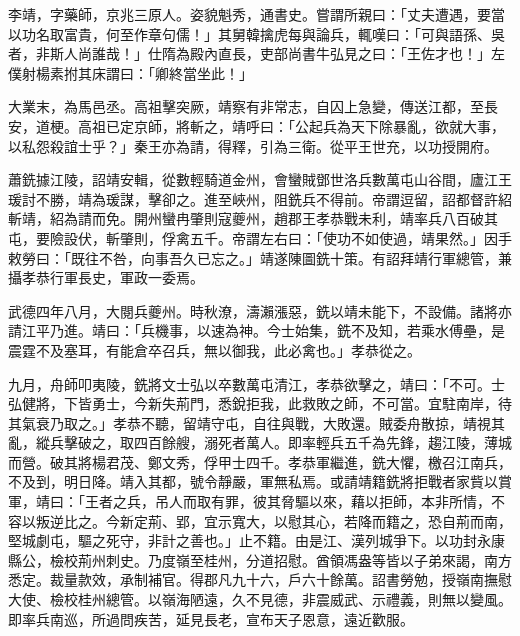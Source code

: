 
\begin{pinyinscope}

 李靖，字藥師，京兆三原人。姿貌魁秀，通書史。嘗謂所親曰：「丈夫遭遇，要當以功名取富貴，何至作章句儒！」其舅韓擒虎每與論兵，輒嘆曰：「可與語孫、吳者，非斯人尚誰哉！」仕隋為殿內直長，吏部尚書牛弘見之曰：「王佐才也！」左僕射楊素拊其床謂曰：「卿終當坐此！」



 大業末，為馬邑丞。高祖擊突厥，靖察有非常志，自囚上急變，傳送江都，至長安，道梗。高祖已定京師，將斬之，靖呼曰：「公起兵為天下除暴亂，欲就大事，以私怨殺誼士乎？」秦王亦為請，得釋，引為三衛。從平王世充，以功授開府。



 蕭銑據江陵，詔靖安輯，從數輕騎道金州，會蠻賊鄧世洛兵數萬屯山谷間，廬江王瑗討不勝，靖為瑗謀，擊卻之。進至峽州，阻銑兵不得前。帝謂逗留，詔都督許紹斬靖，紹為請而免。開州蠻冉肇則寇夔州，趙郡王孝恭戰未利，靖率兵八百破其屯，要險設伏，斬肇則，俘禽五千。帝謂左右曰：「使功不如使過，靖果然。」因手敕勞曰：「既往不咎，向事吾久已忘之。」靖遂陳圖銑十策。有詔拜靖行軍總管，兼攝孝恭行軍長史，軍政一委焉。



 武德四年八月，大閱兵夔州。時秋潦，濤瀨漲惡，銑以靖未能下，不設備。諸將亦請江平乃進。靖曰：「兵機事，以速為神。今士始集，銑不及知，若乘水傅壘，是震霆不及塞耳，有能倉卒召兵，無以御我，此必禽也。」孝恭從之。



 九月，舟師叩夷陵，銑將文士弘以卒數萬屯清江，孝恭欲擊之，靖曰：「不可。士弘健將，下皆勇士，今新失荊門，悉銳拒我，此救敗之師，不可當。宜駐南岸，待其氣衰乃取之。」孝恭不聽，留靖守屯，自往與戰，大敗還。賊委舟散掠，靖視其亂，縱兵擊破之，取四百餘艘，溺死者萬人。即率輕兵五千為先鋒，趨江陵，薄城而營。破其將楊君茂、鄭文秀，俘甲士四千。孝恭軍繼進，銑大懼，檄召江南兵，不及到，明日降。靖入其都，號令靜嚴，軍無私焉。或請靖籍銑將拒戰者家貲以賞軍，靖曰：「王者之兵，吊人而取有罪，彼其脅驅以來，藉以拒師，本非所情，不容以叛逆比之。今新定荊、郢，宜示寬大，以慰其心，若降而籍之，恐自荊而南，堅城劇屯，驅之死守，非計之善也。」止不籍。由是江、漢列城爭下。以功封永康縣公，檢校荊州刺史。乃度嶺至桂州，分道招慰。酋領馮盎等皆以子弟來謁，南方悉定。裁量款效，承制補官。得郡凡九十六，戶六十餘萬。詔書勞勉，授嶺南撫慰大使、檢校桂州總管。以嶺海陋遠，久不見德，非震威武、示禮義，則無以變風。即率兵南巡，所過問疾苦，延見長老，宣布天子恩意，遠近歡服。




\end{pinyinscope}
